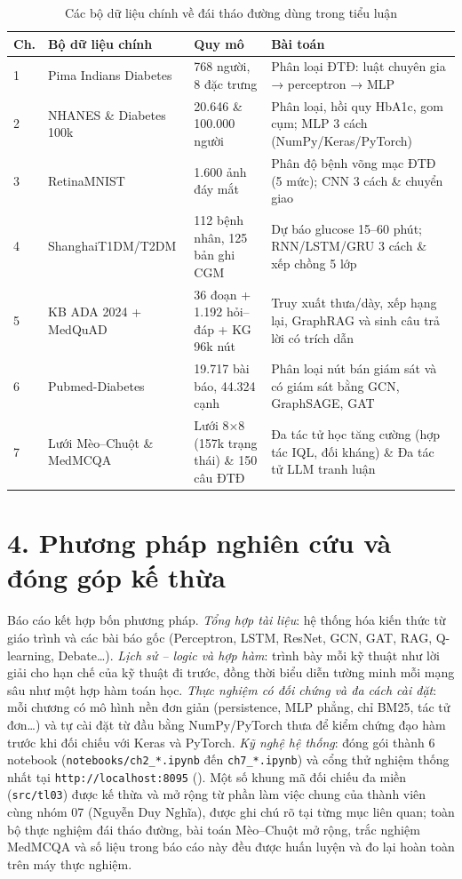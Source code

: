 \begin{table}[H]
\centering
\caption{Các bộ dữ liệu chính về đái tháo đường dùng trong tiểu luận}
\label{tab:datasets}
\small
\begin{tabularx}{\linewidth}{@{}L{1.1cm}L{3.8cm}L{3.5cm}Y@{}}
\toprule
\textbf{Ch.} & \textbf{Bộ dữ liệu chính} & \textbf{Quy mô} & \textbf{Bài toán} \\
 & Pima Indians Diabetes \cite{smith1988} & 768 người, 8 đặc trưng & Phân loại ĐTĐ: luật chuyên gia → perceptron → MLP \\
2 & NHANES \cite{nhanes} \& Diabetes 100k & 20.646 \& 100.000 người & Phân loại, hồi quy HbA1c, gom cụm; MLP 3 cách (NumPy/Keras/PyTorch) \\
3 & RetinaMNIST \cite{yang2023medmnist} & 1.600 ảnh đáy mắt & Phân độ bệnh võng mạc ĐTĐ (5 mức); CNN 3 cách \& chuyển giao \\
4 & ShanghaiT1DM/T2DM \cite{zhao2023shanghai} & 112 bệnh nhân, 125 bản ghi CGM & Dự báo glucose 15–60 phút; RNN/LSTM/GRU 3 cách \& xếp chồng 5 lớp \\
5 & KB ADA 2024 + MedQuAD \cite{benabacha2019} & 36 đoạn + 1.192 hỏi–đáp + KG 96k nút & Truy xuất thưa/dày, xếp hạng lại, GraphRAG và sinh câu trả lời có trích dẫn \\
6 & Pubmed-Diabetes \cite{namata2012} & 19.717 bài báo, 44.324 cạnh & Phân loại nút bán giám sát và có giám sát bằng GCN, GraphSAGE, GAT \\
7 & Lưới Mèo–Chuột \& MedMCQA \cite{pal2022medmcqa} & Lưới 8×8 (157k trạng thái) \& 150 câu ĐTĐ & Đa tác tử học tăng cường (hợp tác IQL, đối kháng) \& Đa tác tử LLM tranh luận \\
\bottomrule
\end{tabularx}
\end{table}

\section*{4. Phương pháp nghiên cứu và đóng góp kế thừa}

Báo cáo kết hợp bốn phương pháp. \emph{Tổng hợp tài liệu}: hệ thống hóa kiến thức từ giáo trình và các bài báo gốc (Perceptron, LSTM, ResNet, GCN, GAT, RAG, Q-learning, Debate\ldots). \emph{Lịch sử – logic và hợp hàm}: trình bày mỗi kỹ thuật như lời giải cho hạn chế của kỹ thuật đi trước, đồng thời biểu diễn tường minh mỗi mạng sâu như một hợp hàm toán học. \emph{Thực nghiệm có đối chứng và đa cách cài đặt}: mỗi chương có mô hình nền đơn giản (persistence, MLP phẳng, chỉ BM25, tác tử đơn\ldots) và tự cài đặt từ đầu bằng NumPy/PyTorch thưa để kiểm chứng đạo hàm trước khi đối chiếu với Keras và PyTorch. \emph{Kỹ nghệ hệ thống}: đóng gói thành 6 notebook (\texttt{notebooks/ch2\_*.ipynb} đến \texttt{ch7\_*.ipynb}) và cổng thử nghiệm thống nhất tại \texttt{http://localhost:8095} (). Một số khung mã đối chiếu đa miền (\texttt{src/tl03}) được kế thừa và mở rộng từ phần làm việc chung của thành viên cùng nhóm 07 (Nguyễn Duy Nghĩa), được ghi chú rõ tại từng mục liên quan; toàn bộ thực nghiệm đái tháo đường, bài toán Mèo–Chuột mở rộng, trắc nghiệm MedMCQA và số liệu trong báo cáo này đều được huấn luyện và đo lại hoàn toàn trên máy thực nghiệm.


